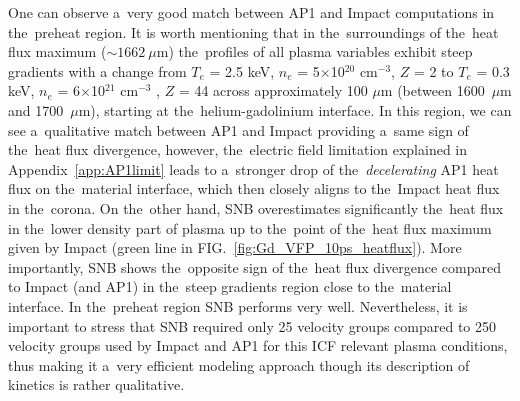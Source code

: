 \documentclass[
 aps,
 jmp,
 amsmath,amssymb,
 twocolumn,
]{revtex4-1}
\newcommand{\figref}[1]{FIG.~\ref{#1}}
\newcommand{\appref}[1]{Appendix~\ref{#1}}
\newcommand{\Zbar}{Z}
\begin{document}
One can observe a~very good
match between AP1 and Impact computations in the~preheat region.
It is worth mentioning that in the~surroundings of the~heat flux maximum 
($\sim 1662~\mu$m) the~profiles of all plasma variables 
exhibit steep gradients 
with a change from $T_e$ = 2.5 keV, $n_e$ = 5$\times$10$^{20}$ cm$^{−3}$, 
$\Zbar$ = 2 to $T_e$ = 0.3 keV, $n_e$ = 6$\times$10$^{21}$ cm$^{−3}$ , 
$\Zbar$ = 44 across approximately 100 $\mu$m 
(between 1600~$\mu$m and 1700~$\mu$m), starting at the~helium-gadolinium 
interface.  
In this region, we can see a~qualitative match between AP1 and Impact 
providing a~same sign of the~heat flux divergence, however,
the~electric field limitation explained in 
\appref{app:AP1limit} leads to a~stronger drop of 
the~\textit{decelerating} AP1 heat flux on the~material 
interface, which then closely aligns to the~Impact heat flux in the~corona. 
On the~other hand, 
SNB overestimates significantly the~heat flux in the~lower density part 
of plasma up to the~point of the~heat flux maximum given by Impact 
(green line in \figref{fig:Gd_VFP_10ps_heatflux}). More 
importantly, SNB shows the~opposite sign of the~heat flux divergence compared to Impact
(and AP1) in the~steep gradients region close to the~material interface. 
In the~preheat region SNB performs 
very well. Nevertheless, it is important to stress that 
SNB required only 25 velocity groups compared to 250 velocity groups used by
Impact and AP1 for this ICF relevant plasma conditions, thus making it a~very
efficient modeling approach though its description of kinetics is rather
qualitative.
\end{document}
